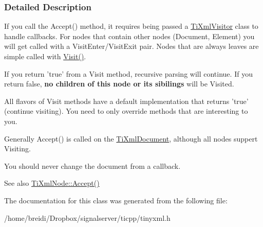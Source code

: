 \subsubsection{Detailed Description}
If you call the Accept() method, it requires being passed a \hyperlink{class_ti_xml_visitor}{TiXmlVisitor} class to handle callbacks. For nodes that contain other nodes (Document, Element) you will get called with a VisitEnter/VisitExit pair. Nodes that are always leaves are simple called with \hyperlink{class_ti_xml_visitor_afad71c71ce6473fb9b4b64cd92de4a19}{Visit()}.

If you return 'true' from a Visit method, recursive parsing will continue. If you return false, {\bfseries no children of this node or its sibilings} will be Visited.

All flavors of Visit methods have a default implementation that returns 'true' (continue visiting). You need to only override methods that are interesting to you.

Generally Accept() is called on the \hyperlink{class_ti_xml_document}{TiXmlDocument}, although all nodes suppert Visiting.

You should never change the document from a callback.

\begin{DoxySeeAlso}{See also}
\hyperlink{class_ti_xml_node_acc0f88b7462c6cb73809d410a4f5bb86}{TiXmlNode::Accept()} 
\end{DoxySeeAlso}


The documentation for this class was generated from the following file:\begin{DoxyCompactItemize}
\item 
/home/breidi/Dropbox/signalserver/ticpp/tinyxml.h\end{DoxyCompactItemize}
